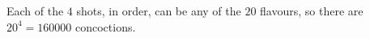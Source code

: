 Each of the $4$ shots, in order, can be any of the $20$ flavours, so there are $20^4=\boxed{160000}$ concoctions.
